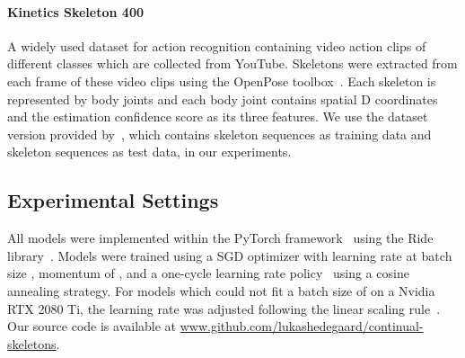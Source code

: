 \documentclass[journal]{IEEEtran}
\theoremstyle{definition}
\begin{document}
\paragraph{Kinetics Skeleton 400~\textnormal{\cite{kay2017kinetics}}} A widely used dataset for action recognition containing  video action clips of  different classes which are collected from YouTube. Skeletons were extracted from each frame of these video clips using the OpenPose toolbox~\cite{cao2019openpose}. Each skeleton is represented by  body joints and each body joint contains spatial D coordinates and the estimation confidence score as its three features. We use the dataset version provided by~\cite{yan2018spatial}, which contains  skeleton sequences as training data and  skeleton sequences as test data, in our experiments. 


\subsection{Experimental Settings}\label{sec:exp-settings}
All models were implemented within the PyTorch framework~\cite{paszke2017automatic} using the Ride library~\cite{hedegaard2021ride}. Models were trained using a SGD optimizer with learning rate  at batch size , momentum of , and a one-cycle learning rate policy~\cite{smith2019superconvergence} using a cosine annealing strategy. For models which could not fit a batch size of  on a Nvidia RTX 2080 Ti, the learning rate was adjusted following the linear scaling rule~\cite{goyal2017accurate}.
Our source code is available at \url{www.github.com/lukashedegaard/continual-skeletons}.
\end{document}
